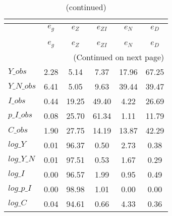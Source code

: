  
\begin{center}
\begin{longtable}{lccccc} 
\caption{VARIANCE DECOMPOSITION (in percent)}\\
 \label{Table:th_var_decomp_uncond}\\
\toprule 
$           $	 & 	 $       {e_g}$	 & 	 $       {e_Z}$	 & 	 $    {e_{ZI}}$	 & 	 $       {e_N}$	 & 	 $       {e_D}$\\
\midrule \endfirsthead 
\caption{(continued)}\\
 \toprule \\ 
$           $	 & 	 $       {e_g}$	 & 	 $       {e_Z}$	 & 	 $    {e_{ZI}}$	 & 	 $       {e_N}$	 & 	 $       {e_D}$\\
\midrule \endhead 
\midrule \multicolumn{6}{r}{(Continued on next page)} \\ \bottomrule \endfoot 
\bottomrule \endlastfoot 
$Y\_obs     $	 & 	        2.28	 & 	        5.14	 & 	        7.37	 & 	       17.96	 & 	       67.25 \\ 
$Y\_N\_obs  $	 & 	        6.41	 & 	        5.05	 & 	        9.63	 & 	       39.44	 & 	       39.47 \\ 
$I\_obs     $	 & 	        0.44	 & 	       19.25	 & 	       49.40	 & 	        4.22	 & 	       26.69 \\ 
$p\_I\_obs  $	 & 	        0.08	 & 	       25.70	 & 	       61.34	 & 	        1.11	 & 	       11.79 \\ 
$C\_obs     $	 & 	        1.90	 & 	       27.75	 & 	       14.19	 & 	       13.87	 & 	       42.29 \\ 
$log\_Y     $	 & 	        0.01	 & 	       96.37	 & 	        0.50	 & 	        2.73	 & 	        0.38 \\ 
$log\_Y\_N  $	 & 	        0.01	 & 	       97.51	 & 	        0.53	 & 	        1.67	 & 	        0.29 \\ 
$log\_I     $	 & 	        0.00	 & 	       96.57	 & 	        1.99	 & 	        0.95	 & 	        0.49 \\ 
$log\_p\_I  $	 & 	        0.00	 & 	       98.98	 & 	        1.01	 & 	        0.00	 & 	        0.00 \\ 
$log\_C     $	 & 	        0.04	 & 	       94.61	 & 	        0.66	 & 	        4.33	 & 	        0.36 \\ 
\end{longtable}
 \end{center}
